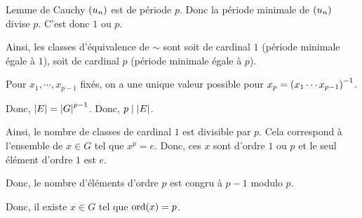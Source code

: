 \documentclass[a4paper,12pt]{article}
\renewcommand\l{\left(}
\renewcommand\r{\right)}
\let\oldleft\left
\renewcommand{\left}{\mathopen{}\mathclose\bgroup\oldleft}
\let\oldright\right
\renewcommand{\right}{\aftergroup\egroup\oldright}
\DeclareMathOperator{\oldord}{ord}
\newcommand{\ord}[1]{\oldord\l#1\r}
\begin{document}
\begin{prv*}{Lemme de Cauchy}
$\l u_n\r$ est de période $p$. Donc la période minimale de $\l u_n\r$ divise $p$. C'est donc $1$ ou $p$.

Ainsi, les classes d'équivalence de $\sim$ sont soit de cardinal $1$ (période minimale égale à $1$), soit de cardinal $p$ (période minimale égale à $p$).

Pour $x_1,\cdots,x_{p-1}$ fixés, on a une unique valeur possible pour $x_p=\l x_1\cdots x_{p-1}\r^{-1}$.

Donc, $\left|E\right|=\left|G\right|^{p-1}$. Donc, $p\mid\left|E\right|$.

Ainsi, le nombre de classes de cardinal $1$ est divisible par $p$. Cela correspond à l'ensemble de $x\in G$ tel que $x^p=e$. Donc, ces $x$ sont d'ordre $1$ ou $p$ et le seul élément d'ordre $1$ est $e$.

Donc, le nombre d'éléments d'ordre $p$ est congru à $p-1$ modulo $p$.

Donc, il existe $x\in G$ tel que $\ord{x}=p$.
\end{prv*}
\end{document}
